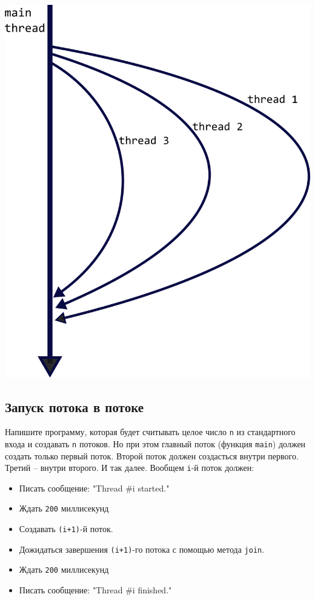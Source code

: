 \documentclass{article}
\begin{document}
\begin{center}
\includegraphics[scale=1]{../images/n_threads.png}
\end{center}

\subsection{Запуск потока в потоке}
Напишите программу, которая будет считывать целое число \texttt{n} из стандартного входа и создавать \texttt{n} потоков. Но при этом главный поток (функция \texttt{main}) должен создать только первый поток. Второй поток должен создасться внутри первого. Третий -- внутри второго. И так далее. Вообщем \texttt{i}-й поток должен:
\begin{itemize}
\item Писать сообщение: "Thread \#i started."
\item Ждать \texttt{200} миллисекунд
\item Создавать \texttt{(i+1)}-й поток.
\item Дожидаться завершения \texttt{(i+1)}-го потока с помощью метода \texttt{join}.
\item Ждать \texttt{200} миллисекунд
\item Писать сообщение: "Thread \#i finished."
\end{itemize}
\end{document}
